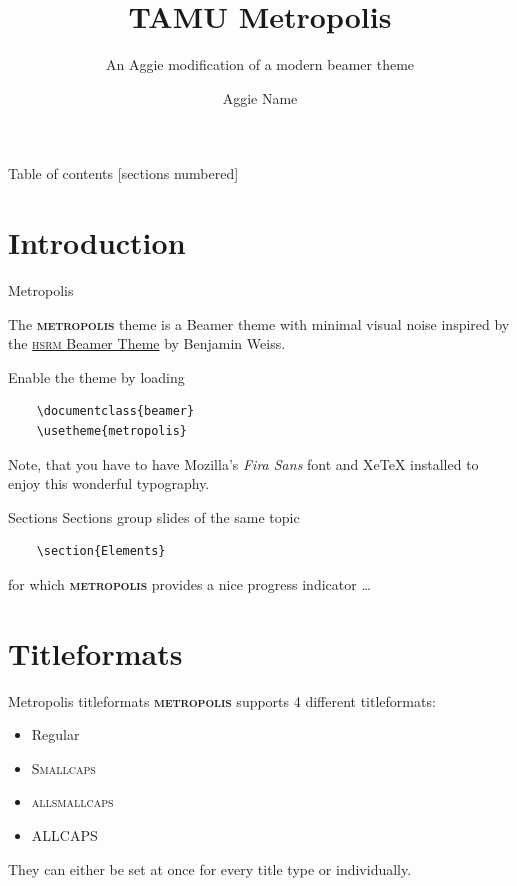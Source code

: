 \documentclass[10pt]{beamer}
\title{TAMU Metropolis}
\subtitle{An Aggie modification of a modern beamer theme}
\date{}
\author{Aggie Name}
\institute{Beamer slides at Texas A\&M University}
\newcommand{\themename}{\textbf{\textsc{metropolis}}\xspace}
\begin{document}
\maketitle

\begin{frame}{Table of contents}
  [sections numbered]
  \tableofcontents%
\end{frame}

\section[Intro]{Introduction}

\begin{frame}[fragile]{Metropolis}

  The \themename theme is a Beamer theme with minimal visual noise
  inspired by the \href{https://github.com/hsrmbeamertheme/hsrmbeamertheme}{\textsc{hsrm} Beamer
  Theme} by Benjamin Weiss.

  Enable the theme by loading

  \begin{verbatim}    \documentclass{beamer}
    \usetheme{metropolis}\end{verbatim}

  Note, that you have to have Mozilla's \emph{Fira Sans} font and XeTeX
  installed to enjoy this wonderful typography.
\end{frame}
\begin{frame}[fragile]{Sections}
  Sections group slides of the same topic

  \begin{verbatim}    \section{Elements}\end{verbatim}

  for which \themename provides a nice progress indicator \ldots
  
\end{frame}

\section{Titleformats}

\begin{frame}{Metropolis titleformats}
	\themename supports 4 different titleformats:
	\begin{itemize}
		\item Regular
		\item \textsc{Smallcaps}
		\item \textsc{allsmallcaps}
		\item ALLCAPS
	\end{itemize}
	They can either be set at once for every title type or individually.
\end{frame}
\end{document}
